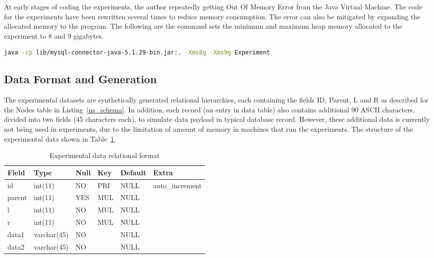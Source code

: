 At early stages of coding the experiments, the author repeatedly getting Out Of Memory Error from the Java Virtual Machine. The code for the experiments have been rewritten several times to reduce memory consumption. The error can also be mitigated by expanding the allocated memory to the program. The following are the command sets the minimum and maximum heap memory allocated to the experiment to 8 and 9 gigabytes.

\begin{lstlisting}[language=bash,caption={Nodes table for nested set model},label=run_client, float]
java -cp lib/mysql-connector-java-5.1.29-bin.jar:. -Xms8g -Xmx9g Experiment
\end{lstlisting}

\subsection{Data Format and Generation}\label{sec_experimental_data}

The experimental datasets are synthetically generated relational hierarchies, each containing the fields ID, Parent, L and R as described for the Nodes table in Listing~\ref{ns_schema}. In addition, each record (an entry in data table) also contains additional 90 ASCII characters, divided into two fields (45 characters each), to simulate data payload in typical database record. However, these additional data is currently not being used in experiments, due to the limitation of amount of memory in machines that run the experiments. The structure of the experimental data shown in Table~\ref{tb_rel_exp_data_format}.

\begin{table}[!h]
\centering
\caption{Experimental data relational format}
\label{tb_rel_exp_data_format}
\begin{tabular}{|l|l|l|l|l|l|}
\hline
\textbf{Field} & \textbf{Type} & \textbf{Null} & \textbf{Key} & \textbf{Default} & \textbf{Extra}  \\ \hline
id             & int(11)       & NO            & PRI          & NULL             & auto\_increment \\ \hline
parent         & int(11)       & YES           & MUL          & NULL             &                 \\ \hline
l              & int(11)       & NO            & MUL          & NULL             &                 \\ \hline
r              & int(11)       & NO            & MUL          & NULL             &                 \\ \hline
data1          & varchar(45)   & NO            &              & NULL             &                 \\ \hline
data2          & varchar(45)   & NO            &              & NULL             &                 \\ \hline
\end{tabular}
\end{table}

